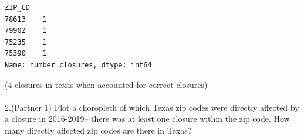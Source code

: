\documentclass[
  letterpaper,
  DIV=11,
  numbers=noendperiod]{scrartcl}
\makeatletter
\let\oldparagraph\paragraph
\renewcommand{\paragraph}{
    \@ifstar
      \xxxParagraphStar
      \xxxParagraphNoStar
  }
\newcommand{\xxxParagraphStar}[1]{\oldparagraph*{#1}\mbox{}}
\newcommand{\xxxParagraphNoStar}[1]{\oldparagraph{#1}\mbox{}}
\makeatother
\begin{document}
\begin{verbatim}
ZIP_CD
78613    1
79902    1
75235    1
75390    1
Name: number_closures, dtype: int64
\end{verbatim}

(4 closures in texas when accounted for correct closures)

\paragraph{2.(Partner 1) Plot a choropleth of which Texas zip codes were
directly affected by a closure in 2016-2019-- there was at least one
closure within the zip code. How many directly affected zip codes are
there in
Texas?}\label{partner-1-plot-a-choropleth-of-which-texas-zip-codes-were-directly-affected-by-a-closure-in-2016-2019-there-was-at-least-one-closure-within-the-zip-code.-how-many-directly-affected-zip-codes-are-there-in-texas}
\end{document}

